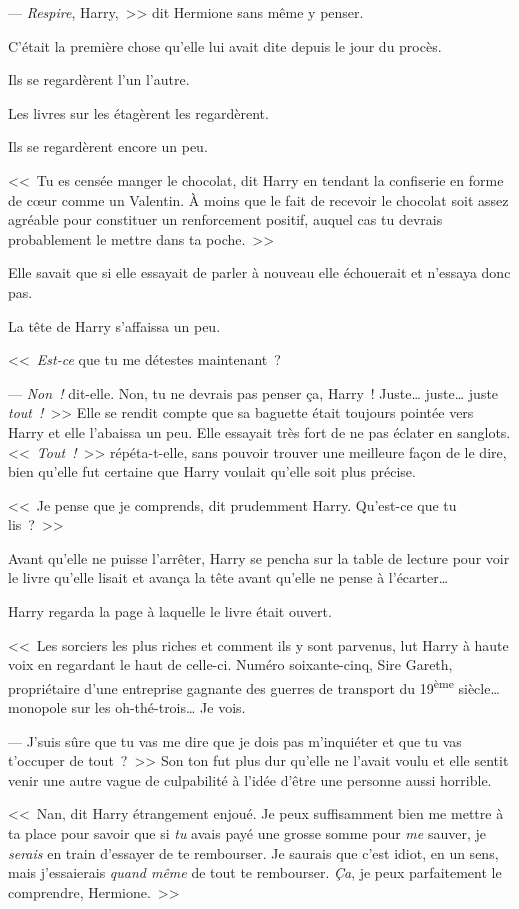 --- \emph{Respire}, Harry,~>> dit Hermione sans même y penser.

C'était la première chose qu'elle lui avait dite depuis le jour du procès.

Ils se regardèrent l'un l'autre.

Les livres sur les étagèrent les regardèrent.

Ils se regardèrent encore un peu.

<<~Tu es censée manger le chocolat, dit Harry en tendant la confiserie en forme de cœur comme un Valentin. À moins que le fait de recevoir le chocolat soit assez agréable pour constituer un renforcement positif, auquel cas tu devrais probablement le mettre dans ta poche.~>>

Elle savait que si elle essayait de parler à nouveau elle échouerait et n'essaya donc pas.

La tête de Harry s'affaissa un peu.

<<~\emph{Est-ce} que tu me détestes maintenant~?

--- \emph{Non~!} dit-elle. Non, tu ne devrais pas penser ça, Harry~! Juste… juste… juste \emph{tout~!}~>> Elle se rendit compte que sa baguette était toujours pointée vers Harry et elle l'abaissa un peu. Elle essayait très fort de ne pas éclater en sanglots. <<~\emph{Tout~!}~>> répéta-t-elle, sans pouvoir trouver une meilleure façon de le dire, bien qu'elle fut certaine que Harry voulait qu'elle soit plus précise.

<<~Je pense que je comprends, dit prudemment Harry. Qu'est-ce que tu lis~?~>>

Avant qu'elle ne puisse l'arrêter, Harry se pencha sur la table de lecture pour voir le livre qu'elle lisait et avança la tête avant qu'elle ne pense à l'écarter…

Harry regarda la page à laquelle le livre était ouvert.

<<~Les sorciers les plus riches et comment ils y sont parvenus, lut Harry à haute voix en regardant le haut de celle-ci. Numéro soixante-cinq, Sire Gareth, propriétaire d'une entreprise gagnante des guerres de transport du 19\textsuperscript{ème} siècle… monopole sur les oh-thé-trois… Je vois.

--- J'suis sûre que tu vas me dire que je dois pas m'inquiéter et que tu vas t'occuper de tout~?~>> Son ton fut plus dur qu'elle ne l'avait voulu et elle sentit venir une autre vague de culpabilité à l'idée d'être une personne aussi horrible.

<<~Nan, dit Harry étrangement enjoué. Je peux suffisamment bien me mettre à ta place pour savoir que si \emph{tu} avais payé une grosse somme pour \emph{me} sauver, je \emph{serais} en train d'essayer de te rembourser. Je saurais que c'est idiot, en un sens, mais j'essaierais \emph{quand même} de tout te rembourser. \emph{Ça}, je peux parfaitement le comprendre, Hermione.~>>

